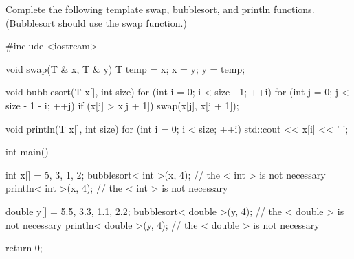 

\nextq
Complete the following template swap, bubblesort, and println functions.
(Bubblesort should use the swap function.)
\\
\ANSWER
\begin{answercode}
#include <iostream>

void swap(T & x, T & y)
{
  T temp = x;
  x = y;
  y = temp;
}

void bubblesort(T x[], int size)
{
  for (int i = 0; i < size - 1; ++i)
  {
    for (int j = 0; j < size - 1 - i; ++j)
    {
      if (x[j] > x[j + 1])
      {
        swap(x[j], x[j + 1]);
      }
    }
  }
}

void println(T x[], int size)
{
    for (int i = 0; i < size; ++i)
    {
        std::cout << x[i] << ' ';
    }
}

int main()
{
    int x[] = {5, 3, 1, 2};
    bubblesort< int >(x, 4);            // the < int > is not necessary
    println< int >(x, 4);               // the < int > is not necessary

    double y[] = {5.5, 3.3, 1.1, 2.2};
    bubblesort< double >(y, 4);         // the < double > is not necessary
    println< double >(y, 4);            // the < double > is not necessary

    return 0;
}
\end{answercode}


